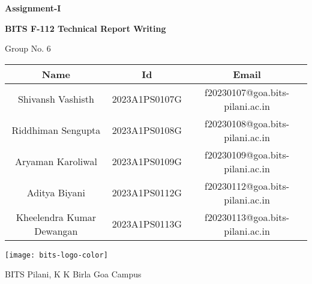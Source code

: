 \begin{titlepage}

	\begin{center}

		\vspace*{1cm}
		\Huge
		\textbf{Assignment-I}

		\vspace{0.5cm}

		\LARGE
		\textbf{BITS F-112 Technical Report Writing}

		\vspace{0.8cm}

		\Large	
		Group No. 6

		\vspace{0.6cm}

		\normalsize
		\begingroup
		\setlength{\tabcolsep}{10pt}
		\renewcommand{\arraystretch}{1.8}
		\begin{tabular} { || c | c | c || }
			\hline
			\textbf{Name} & \textbf{Id} & \textbf{Email} \\ [0.5ex]
			\hline \hline

			\hline  
			Shivansh Vashisth & 2023A1PS0107G & f20230107@goa.bits-pilani.ac.in \\  
			Riddhiman Sengupta & 2023A1PS0108G & f20230108@goa.bits-pilani.ac.in \\
			Aryaman Karoliwal & 2023A1PS0109G & f20230109@goa.bits-pilani.ac.in \\
			Aditya Biyani & 2023A1PS0112G & f20230112@goa.bits-pilani.ac.in \\
			Kheelendra Kumar Dewangan & 2023A1PS0113G & f20230113@goa.bits-pilani.ac.in \\
			[1ex]
			\hline
		\end{tabular}
		\endgroup
		

		\vfill

		\texttt{[image: bits-logo-color]}

		\Large
		BITS Pilani, K K Birla Goa Campus \\ 
	\end{center}

\end{titlepage}

